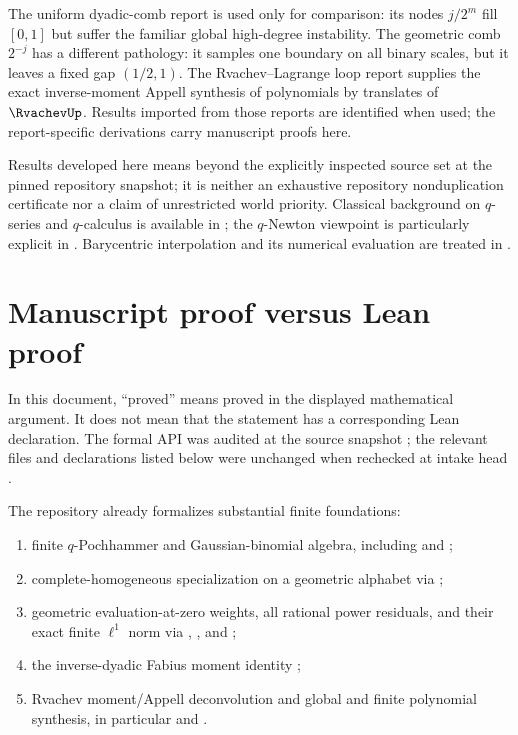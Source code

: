 \documentclass[11pt,oneside]{book}
\numberwithin{equation}{chapter}
\theoremstyle{definition}
\theoremstyle{remark}
\begin{document}
The uniform dyadic-comb report is used only for comparison: its nodes
$j/2^m$ fill $[0,1]$ but suffer the familiar global high-degree instability.
The geometric comb $2^{-j}$ has a different pathology: it samples one
boundary on all binary scales, but it leaves a fixed gap $(1/2,1)$.  The
Rvachev--Lagrange loop report supplies the exact inverse-moment Appell
synthesis of polynomials by translates of $\RvachevUp$.  Results imported from those
reports are identified when used; the report-specific derivations carry
manuscript proofs here.

Results developed here means beyond the explicitly inspected source set at
the pinned repository snapshot; it is neither an exhaustive repository
nonduplication certificate nor a claim of unrestricted world priority.
Classical background
on $q$-series and $q$-calculus is available in
\cite{Andrews1986,GasperRahman2004,KacCheung2002,DLMF17}; the $q$-Newton
viewpoint is particularly explicit in \cite{Kupershmidt2000}.  Barycentric
interpolation and its numerical evaluation are treated in
\cite{BerrutTrefethen2004,Higham2004}.

\section{Manuscript proof versus Lean proof}
\label{sec:lean-boundary}

In this document, ``proved'' means proved in the displayed mathematical
argument.  It does not mean that the statement has a corresponding Lean
declaration.  The formal API was audited at the source snapshot
; the relevant files and
declarations listed below were unchanged when rechecked at intake head
.

The repository already formalizes substantial finite foundations:
\begin{enumerate}
\item finite $q$-Pochhammer and Gaussian-binomial algebra, including
       and
      ;
\item complete-homogeneous specialization on a geometric alphabet via
      ;
\item geometric evaluation-at-zero weights, all rational power residuals,
      and their exact finite $\ell^1$ norm via
      ,
      , and
      ;
\item the inverse-dyadic Fabius moment identity
      ;
\item Rvachev moment/Appell deconvolution and global and finite polynomial
      synthesis, in particular
      and
      .
\end{enumerate}
\end{document}
